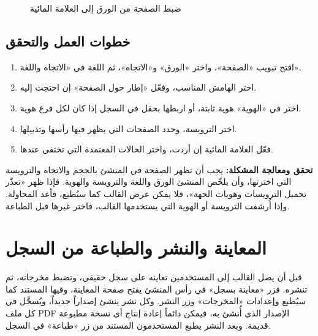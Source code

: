 \begin{figure}[H]
\centering
{}
\rclegend
\caption{ضبط الصفحة من الورق إلى العلامة المائية}
\label{fig:builder-print-page-flow}
\end{figure}

\subsection{خطوات العمل والتحقق}
\begin{enumerate}
\item افتح تبويب «الصفحة»، واختر «الورق» و«الاتجاه»، ثم اللغة في «الاتجاه واللغة».
\item اختر الهامش المناسب، وفعّل «إطار حول الصفحة» إن احتجت إليه.
\item اختر في «الهوية» هوية ثابتة، أو اربطها بحقل في السجل إذا كان لكل فرع هوية.
\item اختر الترويسة، وحدد الصفحات التي يظهر فيها رأسها وتذييلها.
\item فعّل العلامة المائية إن أردت، واختر الحالات المعتمدة التي تختفي عندها.
\end{enumerate}

\textbf{تحقق ومعالجة المشكلة:} يجب أن تظهر الصفحة في المنشئ بالحجم والاتجاه والترويسة التي اخترتها، وأن يلخّص المنشئ الورق واللغة والترويسة والهوية. فإذا ظهر «تعذّر تحميل الترويسات وهويات الجهة»، فلا يمكن عرض القالب كما سيُطبع، فأعد المحاولة. وإذا أُرشفت الترويسة أو الهوية التي يستخدمها القالب، فاختر غيرها قبل الطباعة.

\clearpage
\section{المعاينة والنشر والطباعة من السجل}
\label{sec:builder-feature-print-publish}

قبل أن يصل القالب إلى المستخدمين تعاينه على سجل حقيقي، وتضبط مخرجاته، ثم تنشره. فزر «معاينة بسجل» في رأس المنشئ يفتح صفحة المعاينة، وفيها المستند كما سيُطبع وإعدادات «المخرجات» وزر النشر. وكل نشر ينشئ إصداراً جديداً، ويُسجَّل في كل ملف PDF الإصدار الذي أُنشئ به، فيمكن دائماً إعادة إنتاج أي نسخة مطبوعة قديمة. وبعد النشر يطبع المستخدمون المستند من زر «طباعة» في السجل.

